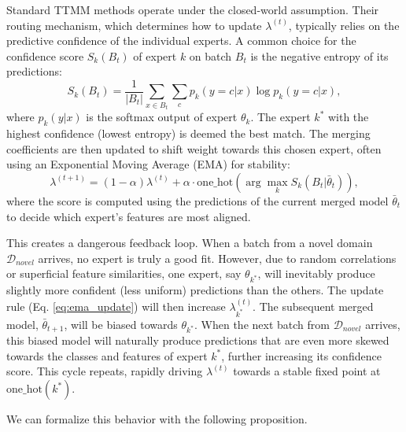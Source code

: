 \documentclass[twoside]{article}
\begin{document}
Standard TTMM methods operate under the closed-world assumption. Their routing mechanism, which determines how to update $\lambda^{(t)}$, typically relies on the predictive confidence of the individual experts. A common choice for the confidence score $S_k(B_t)$ of expert $k$ on batch $B_t$ is the negative entropy of its predictions:
\begin{equation}
S_k(B_t) = \frac{1}{|B_t|} \sum_{x \in B_t} \sum_{c} p_k(y=c|x) \log p_k(y=c|x),
\label{eq:entropy}
\end{equation}
where $p_k(y|x)$ is the softmax output of expert $\theta_k$. The expert $k^*$ with the highest confidence (lowest entropy) is deemed the best match. The merging coefficients are then updated to shift weight towards this chosen expert, often using an Exponential Moving Average (EMA) for stability:
\begin{equation}
\lambda^{(t+1)} = (1-\alpha) \lambda^{(t)} + \alpha \cdot \text{one\_hot}(\arg\max_k S_k(B_t|\bar{\theta}_t)),
\label{eq:ema_update}
\end{equation}
where the score is computed using the predictions of the current merged model $\bar{\theta}_t$ to decide which expert's features are most aligned.

This creates a dangerous feedback loop. When a batch from a novel domain $\mathcal{D}_{novel}$ arrives, no expert is truly a good fit. However, due to random correlations or superficial feature similarities, one expert, say $\theta_{k^*}$, will inevitably produce slightly more confident (less uniform) predictions than the others. The update rule (Eq. \ref{eq:ema_update}) will then increase $\lambda_{k^*}^{(t)}$. The subsequent merged model, $\bar{\theta}_{t+1}$, will be biased towards $\theta_{k^*}$. When the next batch from $\mathcal{D}_{novel}$ arrives, this biased model will naturally produce predictions that are even more skewed towards the classes and features of expert $k^*$, further increasing its confidence score. This cycle repeats, rapidly driving $\lambda^{(t)}$ towards a stable fixed point at $\text{one\_hot}(k^*)$.

We can formalize this behavior with the following proposition.
\end{document}
